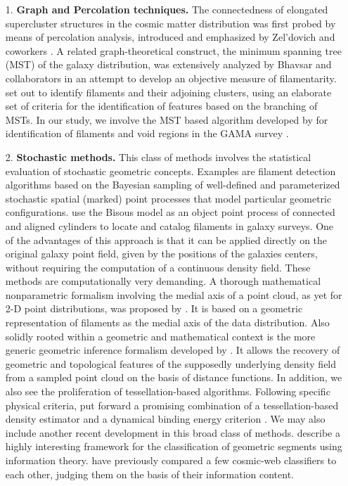\begin{itemize}
\item[1.] {\bf Graph and Percolation techniques.} The connectedness of elongated supercluster structures in the cosmic matter distribution 
was first probed by means of percolation analysis, introduced and emphasized by Zel'dovich and coworkers \citep{Zeldovich1982,Shandarin1989,
Shandarin2004}. A related graph-theoretical construct, the minimum spanning tree (MST) of the galaxy distribution, was extensively 
analyzed by Bhavsar and collaborators \citep{Barrow1985, Colberg2007} in an attempt to develop an objective measure of filamentarity. 
\citet{Colberg2007} set out to identify filaments and their adjoining clusters, using an elaborate set of criteria for the identification of 
features based on the branching of MSTs. In our study, we involve the MST based algorithm developed by \cite{2014MNRAS.440L.106A} for identification 
of filaments and void regions in the GAMA survey \citep{Alpaslan2014}. 

\item[2.] {\bf Stochastic methods.} This class of methods involves the statistical evaluation of stochastic geometric concepts. Examples are 
 filament detection algorithms based on the Bayesian sampling of well-defined and parameterized stochastic spatial (marked) point 
processes that model particular geometric configurations. \cite{2010A&A...510A..38S} use the Bisous model as an object point process of connected and aligned cylinders to locate and catalog filaments in galaxy surveys. One of the advantages of this approach is that it can be applied directly on the original galaxy point field, given by the positions of the galaxies centers, without requiring the computation of a continuous density field. These 
methods are computationally very demanding. A thorough mathematical nonparametric formalism involving the medial axis of a point cloud, as yet 
for 2-D point distributions, was proposed by \cite{Genovese2010}. It is based on a geometric representation of filaments as the medial axis of 
the data distribution. Also solidly rooted within a geometric and mathematical context is the more generic geometric inference formalism 
developed by \cite{Chazal2009}. It allows the recovery of geometric and topological features of the supposedly underlying density field from a 
sampled point cloud on the basis of distance functions. In addition, we also see the proliferation of tessellation-based algorithms. Following 
specific physical criteria, \cite{Gonzalez2010} put forward a promising combination of a tessellation-based density estimator 
and a dynamical binding energy criterion \citep[also see][]{Weygaert2009}. We may also include another recent development in this broad 
class of methods. \cite{Leclercq2015,Leclercq2015c} describe a highly interesting framework for the classification of 
geometric segments using information theory. \cite{Leclercq2016} have  previously compared a few cosmic-web classifiers to each other, judging them on the basis of their information content.
\end{itemize}




